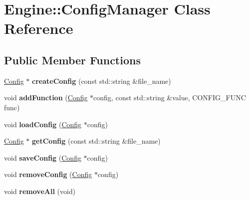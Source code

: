 \hypertarget{classEngine_1_1ConfigManager}{}\section{Engine\+:\+:Config\+Manager Class Reference}
\label{classEngine_1_1ConfigManager}
\subsection*{Public Member Functions}
\begin{DoxyCompactItemize}
\item 
\hypertarget{classEngine_1_1ConfigManager_a95118749dd2f38829ee09a6eb90f70e2}{}\hyperlink{classEngine_1_1Config}{Config} $\ast$ {\bfseries create\+Config} (const std\+::string \&file\+\_\+name)\label{classEngine_1_1ConfigManager_a95118749dd2f38829ee09a6eb90f70e2}

\item 
\hypertarget{classEngine_1_1ConfigManager_a98fc96995f335b6134ab2cb3a6178997}{}void {\bfseries add\+Function} (\hyperlink{classEngine_1_1Config}{Config} $\ast$config, const std\+::string \&value, C\+O\+N\+F\+I\+G\+\_\+\+F\+U\+N\+C func)\label{classEngine_1_1ConfigManager_a98fc96995f335b6134ab2cb3a6178997}

\item 
\hypertarget{classEngine_1_1ConfigManager_af2eb3430ee5ad83d772d6bfbe3745f54}{}void {\bfseries load\+Config} (\hyperlink{classEngine_1_1Config}{Config} $\ast$config)\label{classEngine_1_1ConfigManager_af2eb3430ee5ad83d772d6bfbe3745f54}

\item 
\hypertarget{classEngine_1_1ConfigManager_ac27f74f7d9f15a9b6454c710fc595cb7}{}\hyperlink{classEngine_1_1Config}{Config} $\ast$ {\bfseries get\+Config} (const std\+::string \&file\+\_\+name)\label{classEngine_1_1ConfigManager_ac27f74f7d9f15a9b6454c710fc595cb7}

\item 
\hypertarget{classEngine_1_1ConfigManager_a80a1a3ceaa64a0de6b469b7692351e21}{}void {\bfseries save\+Config} (\hyperlink{classEngine_1_1Config}{Config} $\ast$config)\label{classEngine_1_1ConfigManager_a80a1a3ceaa64a0de6b469b7692351e21}

\item 
\hypertarget{classEngine_1_1ConfigManager_a2aaa3562ee59c501b6d8b9be51275c32}{}void {\bfseries remove\+Config} (\hyperlink{classEngine_1_1Config}{Config} $\ast$config)\label{classEngine_1_1ConfigManager_a2aaa3562ee59c501b6d8b9be51275c32}

\item 
\hypertarget{classEngine_1_1ConfigManager_a9c732aeabdb06db0f9079646bf579144}{}void {\bfseries remove\+All} (void)\label{classEngine_1_1ConfigManager_a9c732aeabdb06db0f9079646bf579144}

\end{DoxyCompactItemize}
